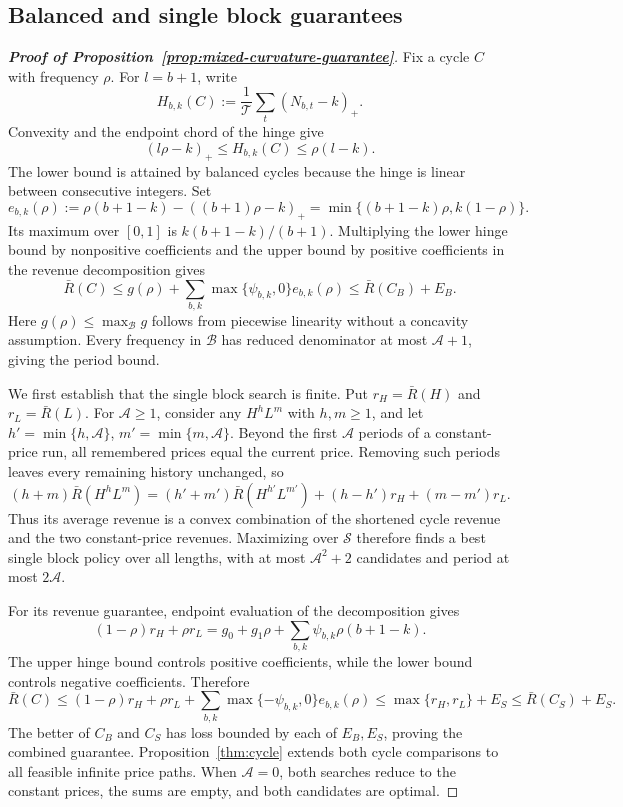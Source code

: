 \par\endgroup

\subsection{Balanced and single block guarantees}
\label{app:simple-policy-guarantees}
\hypertarget{proof-mixed-curvature}{}
\begin{proof}[\normalfont\bfseries Proof of Proposition~\ref{prop:mixed-curvature-guarantee}]
Fix a cycle \(C\) with frequency \(\rho\). For \(l=b+1\), write
\[
 H_{b,k}(C):=\frac1{\mathcal T}\sum_t(N_{b,t}-k)_+.
\]
Convexity and the endpoint chord of the hinge give
\[
 (l\rho-k)_+\le H_{b,k}(C)\le\rho(l-k).
\]
The lower bound is attained by balanced cycles because the hinge is linear between consecutive integers. Set
\[
 e_{b,k}(\rho):=\rho(b+1-k)-((b+1)\rho-k)_+
 =\min\{(b+1-k)\rho,k(1-\rho)\}.
\]
Its maximum over \([0,1]\) is \(k(b+1-k)/(b+1)\). Multiplying the lower hinge bound by nonpositive coefficients and the upper bound by positive coefficients in the revenue decomposition gives
\[
 \bar R(C)\le g(\rho)+\sum_{b,k}\max\{\psi_{b,k},0\}e_{b,k}(\rho)
 \le\bar R(C_B)+E_B.
\]
Here \(g(\rho)\le\max_{\mathcal B}g\) follows from piecewise linearity without a concavity assumption. Every frequency in \(\mathcal B\) has reduced denominator at most \(\mathcal A+1\), giving the period bound.

We first establish that the single block search is finite. Put \(r_H=\bar R(H)\) and \(r_L=\bar R(L)\). For \(\mathcal A\ge1\), consider any \(H^hL^m\) with \(h,m\ge1\), and let \(h'=\min\{h,\mathcal A\}\), \(m'=\min\{m,\mathcal A\}\). Beyond the first \(\mathcal A\) periods of a constant-price run, all remembered prices equal the current price. Removing such periods leaves every remaining history unchanged, so
\[
 (h+m)\bar R(H^hL^m)
 =(h'+m')\bar R(H^{h'}L^{m'})
       +(h-h')r_H+(m-m')r_L.
\]
Thus its average revenue is a convex combination of the shortened cycle revenue and the two constant-price revenues. Maximizing over \(\mathcal S\) therefore finds a best single block policy over all lengths, with at most \(\mathcal A^2+2\) candidates and period at most \(2\mathcal A\).

For its revenue guarantee, endpoint evaluation of the decomposition gives
\[
 (1-\rho)r_H+\rho r_L
 =g_0+g_1\rho+\sum_{b,k}\psi_{b,k}\rho(b+1-k).
\]
The upper hinge bound controls positive coefficients, while the lower bound controls negative coefficients. Therefore
\[
 \bar R(C)\le(1-\rho)r_H+\rho r_L
             +\sum_{b,k}\max\{-\psi_{b,k},0\}e_{b,k}(\rho)
 \le\max\{r_H,r_L\}+E_S
 \le\bar R(C_S)+E_S.
\]
The better of \(C_B\) and \(C_S\) has loss bounded by each of \(E_B,E_S\), proving the combined guarantee. Proposition~\ref{thm:cycle} extends both cycle comparisons to all feasible infinite price paths. When \(\mathcal A=0\), both searches reduce to the constant prices, the sums are empty, and both candidates are optimal.
\end{proof}

